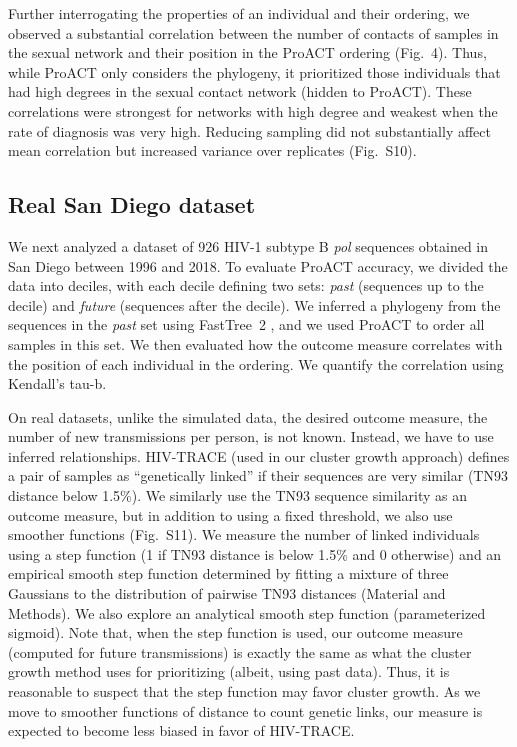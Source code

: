 \documentclass[oupdraft]{sysbio}
\newcommand{\PLWH}{sample\xspace}
\begin{document}
Further interrogating the properties of an individual and their ordering, we observed a substantial correlation between the number of contacts of \PLWH{s} in the sexual network and their position in the ProACT ordering (Fig.~4). 
Thus, while ProACT only considers the phylogeny, it  prioritized those individuals that had high degrees in the sexual contact network (hidden to ProACT). 
These correlations were strongest for networks with high degree and weakest when the rate of diagnosis was very high. 
Reducing sampling did not substantially affect mean correlation but increased variance over replicates (Fig.~S10).





\subsection{Real San Diego dataset}
We next analyzed a dataset of 926 HIV-1 subtype B \textit{pol} sequences obtained in San Diego between 1996 and 2018.
To evaluate ProACT accuracy,
we divided the data into deciles, with each decile defining two sets: \textit{past} (sequences up to the decile) and \textit{future} (sequences after the decile). We inferred a phylogeny from the sequences  in the \textit{past} set using FastTree~2 \cite{Price2010}, %
and we used ProACT to order all \PLWH{s} in this set. 
We then evaluated how the  outcome measure correlates with the position of each individual in the ordering. 
We quantify the correlation using Kendall's tau-b.

On real datasets, unlike the simulated data, the desired outcome measure, the number of new transmissions per person, is not known. 
Instead, we have to use inferred relationships.
HIV-TRACE (used in our cluster growth approach) defines
a pair of \PLWH{s} as ``genetically linked''
if their sequences are very similar (TN93 distance below 1.5\%).
We similarly use the TN93 sequence similarity as an outcome measure, but in addition to using a fixed threshold, we also use smoother functions (Fig.~S11).
We measure the number of linked individuals using a step function (1 if TN93 distance is below 1.5\% and 0 otherwise) 
and an empirical smooth step function determined by fitting a mixture of three Gaussians to the distribution of pairwise TN93 distances (Material and Methods).
We also explore an analytical smooth step function (parameterized sigmoid).  
Note that, when the step function is used, our outcome measure (computed for future transmissions) is exactly the same as what the cluster growth method uses for prioritizing (albeit, using past data). 
Thus, it is reasonable to suspect that the step function may favor cluster growth. 
As we move to smoother functions of distance to count genetic links, our measure is expected to become less biased in favor of HIV-TRACE. 
\end{document}
